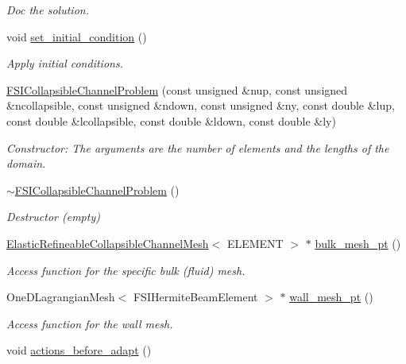 \begin{DoxyCompactItemize}
\begin{DoxyCompactList}\small\item\em Doc the solution. \end{DoxyCompactList}\item 
void \hyperlink{classFSICollapsibleChannelProblem_afdd6752cb134fd09ee8830158ed557b2}{set\+\_\+initial\+\_\+condition} ()
\begin{DoxyCompactList}\small\item\em Apply initial conditions. \end{DoxyCompactList}\item 
\hyperlink{classFSICollapsibleChannelProblem_afe14ae0d2bdfc9a15969c9bdcd6e2512}{F\+S\+I\+Collapsible\+Channel\+Problem} (const unsigned \&nup, const unsigned \&ncollapsible, const unsigned \&ndown, const unsigned \&ny, const double \&lup, const double \&lcollapsible, const double \&ldown, const double \&ly)
\begin{DoxyCompactList}\small\item\em Constructor\+: The arguments are the number of elements and the lengths of the domain. \end{DoxyCompactList}\item 
\hyperlink{classFSICollapsibleChannelProblem_abe33aaaae15ea3eb10885527a1d1ad9a}{$\sim$\+F\+S\+I\+Collapsible\+Channel\+Problem} ()
\begin{DoxyCompactList}\small\item\em Destructor (empty) \end{DoxyCompactList}\item 
\hyperlink{classElasticRefineableCollapsibleChannelMesh}{Elastic\+Refineable\+Collapsible\+Channel\+Mesh}$<$ E\+L\+E\+M\+E\+NT $>$ $\ast$ \hyperlink{classFSICollapsibleChannelProblem_ac08de7f582e4e2d7e6953edd15707d89}{bulk\+\_\+mesh\+\_\+pt} ()
\begin{DoxyCompactList}\small\item\em Access function for the specific bulk (fluid) mesh. \end{DoxyCompactList}\item 
One\+D\+Lagrangian\+Mesh$<$ F\+S\+I\+Hermite\+Beam\+Element $>$ $\ast$ \hyperlink{classFSICollapsibleChannelProblem_ae8b71da8da82f3c52387052ce400b930}{wall\+\_\+mesh\+\_\+pt} ()
\begin{DoxyCompactList}\small\item\em Access function for the wall mesh. \end{DoxyCompactList}\item 
void \hyperlink{classFSICollapsibleChannelProblem_a91b30b3d0369c178d3a79f5658644f1b}{actions\+\_\+before\+\_\+adapt} ()

\end{DoxyCompactItemize}
